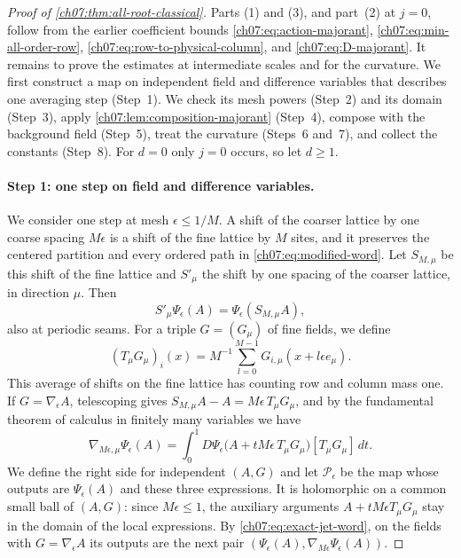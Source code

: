 \begin{proof}[Proof of \cref{ch07:thm:all-root-classical}]
Parts (1) and (3), and part~(2) at $j=0$, follow from the earlier coefficient bounds \eqref{ch07:eq:action-majorant}, \eqref{ch07:eq:min-all-order-row}, \eqref{ch07:eq:row-to-physical-column}, and \eqref{ch07:eq:D-majorant}. It remains to prove the estimates at intermediate scales and for the curvature. We first construct a map on independent field and difference variables that describes one averaging step (Step~1). We check its mesh powers (Step~2) and its domain (Step~3), apply \cref{ch07:lem:composition-majorant} (Step~4), compose with the background field (Step~5), treat the curvature (Steps~6 and~7), and collect the constants (Step~8). For $d=0$ only $j=0$ occurs, so let $d\ge1$.

\paragraph{Step 1: one step on field and difference variables.}
We consider one step at mesh $\epsilon\le1/M$. A shift of the coarser lattice by one coarse spacing $M\epsilon$ is a shift of the fine lattice by $M$ sites, and it preserves the centered partition and every ordered path in \eqref{ch07:eq:modified-word}. Let $S_{M,\mu}$ be this shift of the fine lattice and $S'_\mu$ the shift by one spacing of the coarser lattice, in direction $\mu$. Then
\[
 S'_\mu\Psi_\epsilon(A)=\Psi_\epsilon(S_{M,\mu}A),
\]
also at periodic seams. For a triple $G=(G_\mu)$ of fine fields, we define
\[
 (T_\mu G_\mu)_i(x)=M^{-1}\sum_{l=0}^{M-1}G_{i,\mu}(x+l\epsilon e_\mu).
\]
This average of shifts on the fine lattice has counting row and column mass one. If $G=\nabla_\epsilon A$, telescoping gives $S_{M,\mu}A-A=M\epsilon\,T_\mu G_\mu$, and by the fundamental theorem of calculus in finitely many variables we have
\begin{equation}\label{ch07:eq:exact-jet-word}
 \nabla_{M\epsilon,\mu}\Psi_\epsilon(A)=\int_0^1D\Psi_\epsilon\bigl(A+tM\epsilon\,T_\mu G_\mu\bigr)[T_\mu G_\mu]\,dt .
\end{equation}
We define the right side for independent $(A,G)$ and let $\mathcal P_\epsilon$ be the map whose outputs are $\Psi_\epsilon(A)$ and these three expressions. It is holomorphic on a common small ball of $(A,G)$: since $M\epsilon\le1$, the auxiliary arguments $A+tM\epsilon T_\mu G_\mu$ stay in the domain of the local expressions. By \eqref{ch07:eq:exact-jet-word}, on the fields with $G=\nabla_\epsilon A$ its outputs are the next pair $(\Psi_\epsilon(A),\nabla_{M\epsilon}\Psi_\epsilon(A))$.


\end{proof}
